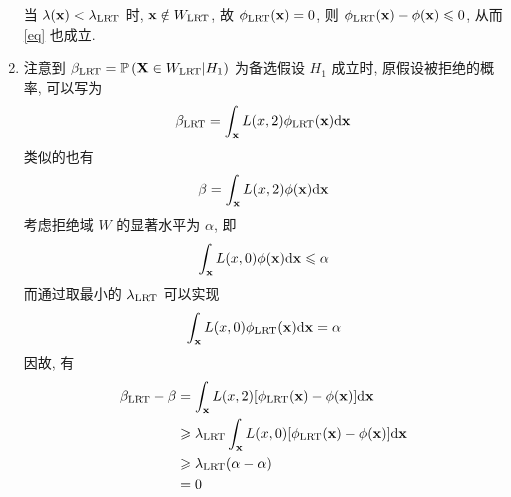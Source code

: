 \documentclass[8pt]{article}
\theoremstyle{compact}
\def\le{\leqslant}
\def\ge{\geqslant}
\def\P#1{\mathbb{P}\left({#1}\right)}
\begin{document}
\begin{enumerate}
	当 $\lambda(\textbf x) < \lambda_{\text{LRT}}$ 时, $\textbf x \notin W_{\text{LRT}}$, 故 $\phi_{\text{LRT}}(\mathbf x) = 0$, 则 $\phi_{\LRT}(\mathbf x) - \phi(\mathbf x) \le 0$, 从而 \cref{eq} 也成立.

	\item 注意到 $\beta_{\LRT} = \P{\mathbf X \in W_{\LRT} | H_1}$ 为备选假设 $H_1$ 成立时, 原假设被拒绝的概率, 可以写为 $$\beta_{\text{LRT}} = \int_{\mathbf x}L(x, 2) \phi_{\text{LRT}}(\mathbf x)\text d\mathbf x$$ 类似的也有 $$\beta = \int_{\mathbf x}L(x, 2) \phi(\mathbf x)\text d\mathbf x$$ 考虑拒绝域 $W$ 的显著水平为 $\alpha$, 即 $$\int_{\mathbf x}L(x, 0)\phi(\mathbf x)\text d\mathbf x \le \alpha$$ 而通过取最小的 $\lambda_{\text{LRT}}$ 可以实现 $$\int_{\mathbf x}L(x, 0)\phi_{\text{LRT}}(\mathbf x)\text d\mathbf x = \alpha$$ 因故, 有 \begin{align*}
		\begin{split}
			\beta_{\LRT} - \beta &= \int_{\mathbf x}L(x, 2)[\phi_{\LRT}(\mathbf x) - \phi(\mathbf x)]\text d \mathbf x \\
			&\ge \lambda_{\LRT}\int_{\mathbf x}L(x, 0)[\phi_{\LRT}(\mathbf x) - \phi(\mathbf x)]\text d \mathbf x \\
			&\ge \lambda_{\LRT}(\alpha - \alpha) \\
			&= 0
		\end{split}
	\end{align*}

\end{enumerate}
\end{document}
